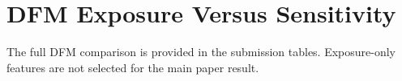 \section{DFM Exposure Versus Sensitivity}
The full DFM comparison is provided in the submission tables. Exposure-only features are not selected for the main paper result.
